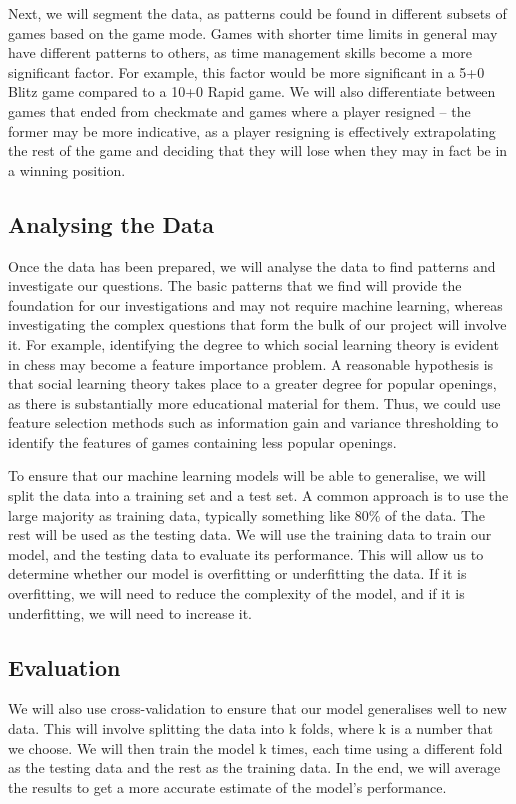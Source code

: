 \documentclass[%
 superscriptaddress,
showpacs,preprintnumbers,
 amsmath,
 amssymb,
 aps,
 pra,
showkeys,
onecolumn,
notitlepage,
11pt,
tightenlines      %
]{revtex4-1}
\begin{document}
Next, we will segment the data, as patterns could be found in different subsets of games based on the game mode. Games with shorter time limits in general may have different patterns to others, as time management skills become a more significant factor. For example, this factor would be more significant in a 5+0 Blitz game compared to a 10+0 Rapid game. We will also differentiate between games that ended from checkmate and games where a player resigned -- the former may be more indicative, as a player resigning is effectively extrapolating the rest of the game and deciding that they will lose when they may in fact be in a winning position.

\subsection{Analysing the Data}
Once the data has been prepared, we will analyse the data to find patterns and investigate our questions. The basic patterns that we find will provide the foundation for our investigations and may not require machine learning, whereas investigating the complex questions that form the bulk of our project will involve it. For example, identifying the degree to which social learning theory is evident in chess may become a feature importance problem. A reasonable hypothesis is that social learning theory takes place to a greater degree for popular openings, as there is substantially more educational material for them. Thus, we could use feature selection methods such as information gain and variance thresholding to identify the features of games containing less popular openings.

To ensure that our machine learning models will be able to generalise, we will split the data into a training set and a test set. A common approach is to use the large majority as training data, typically something like 80\% of the data. The rest will be used as the testing data. We will use the training data to train our model, and the testing data to evaluate its performance. This will allow us to determine whether our model is overfitting or underfitting the data. If it is overfitting, we will need to reduce the complexity of the model, and if it is underfitting, we will need to increase it.


\subsection{Evaluation}

We will also use cross-validation to ensure that our model generalises well to new data. This will involve splitting the data into k folds, where k is a number that we choose. We will then train the model k times, each time using a different fold as the testing data and the rest as the training data. In the end, we will average the results to get a more accurate estimate of the model's performance.
\end{document}
